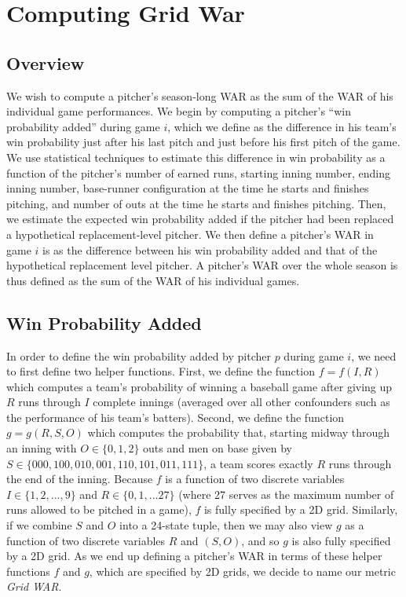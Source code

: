 \documentclass[12pt]{article}
\begin{document}
\section{Computing Grid War}

\subsection{Overview}

We wish to compute a pitcher's season-long WAR as the sum of the WAR of his individual game performances. We begin by computing a pitcher's ``win probability added'' during game $i$, which we define as the difference in his team's win probability just after his last pitch and just before his first pitch of the game. We use statistical techniques to estimate this difference in win probability as a function of the pitcher's number of earned runs, starting inning number, ending inning number, base-runner configuration at the time he starts and finishes pitching, and number of outs at the time he starts and finishes pitching. Then, we estimate the expected win probability added if the pitcher had been replaced a hypothetical replacement-level pitcher. We then define a pitcher's WAR in game $i$ is as the difference between his win probability added and that of the hypothetical replacement level pitcher. A pitcher's WAR over the whole season is thus defined as the sum of the WAR of his individual games.

\subsection{Win Probability Added}

In order to define the win probability added by pitcher $p$ during game $i$, we need to first define two helper functions. First, we define the function $f = f(I,R)$ which computes a team's probability of winning a baseball game after giving up $R$ runs through $I$ complete innings (averaged over all other confounders such as the performance of his team's batters). Second, we define the function $g = g(R,S,O)$ which computes the probability that, starting midway through an inning with $O \in \{0,1,2\}$ outs and men on base given by $S \in \{000,100,010,001,110,101,011,111\}$, a team scores exactly $R$ runs through the end of the inning. Because $f$ is a function of two discrete variables $I \in \{1,2,...,9\}$ and $R \in \{0,1,...27\}$ (where 27 serves as the maximum number of runs allowed to be pitched in a game), $f$ is fully specified by a 2D grid. Similarly, if we combine $S$ and $O$ into a 24-state tuple, then we may also view $g$ as a function of two discrete variables $R$ and $(S,O)$, and so $g$ is also fully specified by a 2D grid. As we end up defining a pitcher's WAR in terms of these helper functions $f$ and $g$, which are specified by 2D grids, we decide to name our metric \textit{Grid WAR}. 
\end{document}
